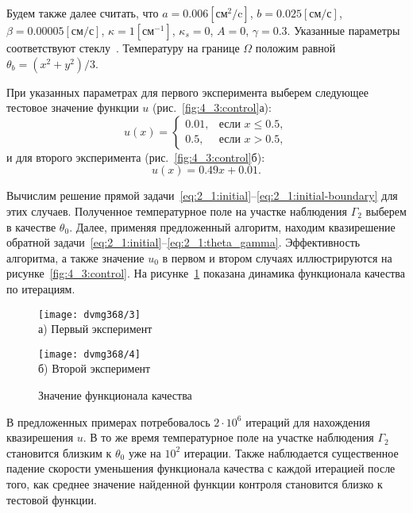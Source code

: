 Будем также далее считать, что $a = 0.006[\text{см}^2/\text{c}]$,
$b=0.025[\text{см}/\text{с}]$, $\beta = 0.00005[\text{см}/\text{с}]$,
$\kappa=1[\text{см}^{-1}]$, $\kappa_s = 0$, $A = 0$, $\gamma = 0.3$.
Указанные параметры соответствуют стеклу~\cite{Grenkin2016a}.
Температуру на границе $\Omega$ положим равной $\theta_b = (x^2+y^2)/3$.

При указанных параметрах для первого эксперимента выберем следующее тестовое
значение функции $u$ (рис.~\ref{fig:4_3:control}а):
\begin{equation}
    \label{eq:4_3:equation}
    u(x)=
    \begin{cases}
        0.01, & \text{если } x \le 0.5, \\
        0.5, & \text{если } x > 0.5,
    \end{cases}
\end{equation}
и для второго эксперимента (рис.~\ref{fig:4_3:control}б):
\begin{equation}
    \label{eq:4_3:test_function_1}
    u(x)=0.49x+0.01.
\end{equation}

Вычислим решение прямой
задачи~\eqref{eq:2_1:initial}--\eqref{eq:2_1:initial-boundary}
для этих случаев.
Полученное температурное поле на участке наблюдения
$\Gamma_2$ выберем в качестве $\theta_0$.
Далее, применяя предложенный алгоритм, находим квазирешение обратной
задачи~\eqref{eq:2_1:initial}--\eqref{eq:2_1:theta_gamma}.
Эффективность алгоритма, а также значение $u_0$ в первом и
втором случаях иллюстрируются на рисунке~\ref{fig:4_3:control}.
На рисунке~\ref{fig:4_3:cost} показана динамика функционала качества по итерациям.
\begin{figure}[h!t]
    \begin{minipage}[b][][b]{0.49\linewidth}
        \centering
        \texttt{[image: dvmg368/3]} \\ а) Первый эксперимент
    \end{minipage}
    \hfill
    \begin{minipage}[b][][b]{0.49\linewidth}
        \centering
        \texttt{[image: dvmg368/4]} \\ б) Второй эксперимент
    \end{minipage}
    \caption{Значение функционала качества}
    \label{fig:4_3:cost}
\end{figure}

\begin{remark}
    В предложенных примерах потребовалось
    $2 \cdot 10^6$ итераций для нахождения квазирешения $u$.
    В то же время температурное поле на участке наблюдения
    $\Gamma_2$ становится близким к $\theta_0$ уже на $10^2$ итерации.
    Также наблюдается существенное падение скорости уменьшения функционала
    качества с каждой итерацией после того, как среднее значение найденной
    функции контроля становится близко к тестовой функции.
\end{remark}

